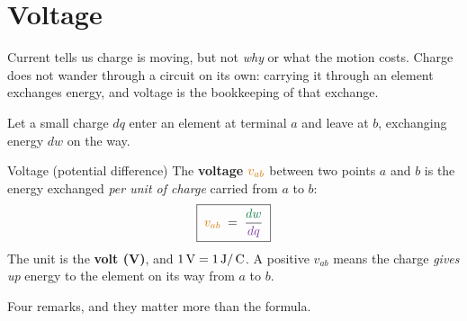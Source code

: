 \documentclass[11pt,a4paper]{article}
\newcommand{\Vcol}[1]{\textcolor{cvolt}{#1}}
\newcommand{\Pcol}[1]{\textcolor{cpow}{#1}}
\newcommand{\Qcol}[1]{\textcolor{ccharge}{#1}}
\newcommand{\uni}[1]{\,\mathrm{#1}}
\newcommand{\Cb}{\uni{C}}  \newcommand{\s}{\uni{s}}
\begin{document}
\section{Voltage}

Current tells us charge is moving, but not \emph{why} or what the motion costs. Charge
does not wander through a circuit on its own: carrying it through an element exchanges
energy, and voltage is the bookkeeping of that exchange.

Let a small charge $dq$ enter an element at terminal $a$ and leave at $b$, exchanging
energy $dw$ on the way.

\begin{center}
\end{center}

\begin{definitionbox}{Voltage (potential difference)}
The \textbf{voltage} $\Vcol{v_{ab}}$ between two points $a$ and $b$ is the energy
exchanged \emph{per unit of charge} carried from $a$ to $b$:
\[
  \boxed{\;\Vcol{v_{ab}} \;=\; \frac{\Pcol{dw}}{\Qcol{dq}}\;}
\]
The unit is the \textbf{volt (V)}, and $1\V = 1\J/\Cb$. A positive $v_{ab}$ means the
charge \emph{gives up} energy to the element on its way from $a$ to $b$.
\end{definitionbox}

Four remarks, and they matter more than the formula.
\end{document}

